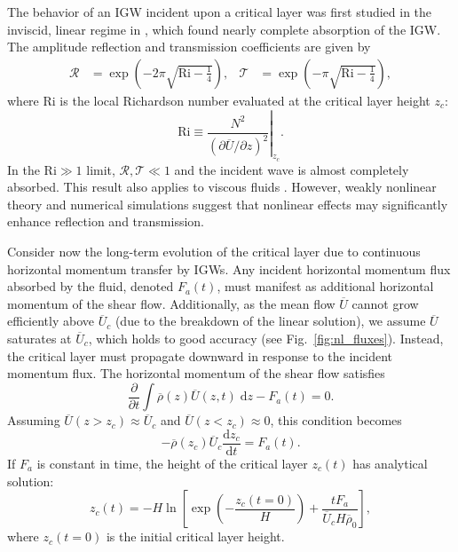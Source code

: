 \documentclass[
        fleqn,
        usenatbib,
    ]{mnras}
\newcommand*{\rd}[2]{\frac{\mathrm{d}#1}{\mathrm{d}#2}}
\newcommand*{\pd}[2]{\frac{\partial#1}{\partial#2}}
\newcommand*{\pdil}[2]{\partial#1/\partial#2}
\newcommand*{\at}[1]{\left.#1\right|}
\newcommand*{\p}[1]{\left(#1\right)}
\newcommand*{\s}[1]{\left[#1\right]}
\begin{document}
The behavior of an IGW incident upon a critical layer was first studied in the
inviscid, linear regime in \citet{booker_bretherton}, which found nearly
complete absorption of the IGW\@. The amplitude
reflection and transmission coefficients are given by
\begin{align}
    \mathcal{R} &= \exp\p{-2\pi \sqrt{\mathrm{Ri} - \frac{1}{4}}}, &
    \mathcal{T} &= \exp\p{-\pi \sqrt{\mathrm{Ri} - \frac{1}{4}}},
        \label{eq:crit_coeffs}
\end{align}
where $\mathrm{Ri}$ is the local Richardson number evaluated at the critical
layer height $z_c$:
\begin{equation}
    \mathrm{Ri} \equiv \at{\frac{N^2}{\p{\pdil{\overline{U}}{z}}^2}}_{z_c}.
        \label{eq:ri_def}
\end{equation}
In the $\mathrm{Ri} \gg 1$ limit, $\mathcal{R}, \mathcal{T} \ll 1$ and the
incident wave is almost completely absorbed. This result also applies to viscous
fluids \citep{hazel}. However, weakly nonlinear theory \citep{brown_stewartson}
and numerical simulations \citep{winters1994} suggest that nonlinear effects may
significantly enhance reflection and transmission.

Consider now the long-term evolution of the critical layer due to continuous
horizontal momentum transfer by IGWs. \textcolor{Corr}{Any incident horizontal
momentum flux absorbed by the fluid, denoted $F_a(t)$, must manifest as
additional horizontal momentum of the shear flow}.
\textcolor{Corr}{Additionally, as the mean flow $\overline{U}$ cannot grow
efficiently above $\overline{U}_c$ (due to the breakdown of the linear
solution), we assume $\overline{U}$ saturates at $\overline{U}_c$, which holds
to good accuracy (see Fig.~\ref{fig:nl_fluxes}). Instead, the critical layer
must propagate downward in response to the incident momentum flux.} The
horizontal momentum of the shear flow satisfies
\begin{equation}
    \pd{}{t}\int\limits \overline{\rho}(z) \overline{U}(z, t)\;\mathrm{d}z
        - F_a(t) = 0.
\end{equation}
Assuming $\overline{U}(z > z_c) \approx \overline{U}_c$ and $\overline{U}(z <
z_c) \approx 0$, this condition becomes
\begin{equation}
    -\overline{\rho}(z_c) \overline{U}_c\rd{z_c}{t} = F_a(t).\label{eq:zc_anal}
\end{equation}
If $F_a$ is constant in time, the height of the critical layer $z_c(t)$ has
analytical solution:
\begin{equation}
    z_c(t) = -H\ln \s{\exp\p{-\frac{z_c(t = 0)}{H}} +
        \frac{tF_a}{\overline{U}_c H\overline{\rho}_0}},\label{eq:zc_sol}
\end{equation}
where $z_c(t = 0)$ is the initial critical layer height.
\end{document}
